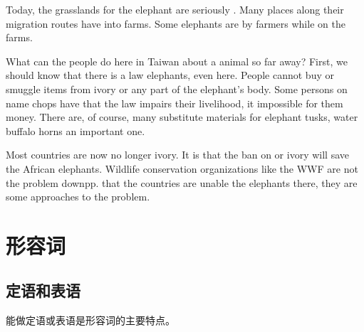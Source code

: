 Today, the  grasslands for the elephant are seriously
. Many places along their migration routes have 
 into farms. Some elephants are  by farmers while
 on the farms.

What can the people do here in Taiwan about a  animal
 so far away? First, we should know that there is a law
 elephants, even here. People cannot buy or smuggle items
 from ivory or any part of the elephant's body. Some
 persons  on  name chops have
  that the law impairs their livelihood, 
it impossible for them  money. There are, of course, many
substitute materials for elephant tusks, water buffalo horns  an
important one.

Most countries are now no longer  ivory. It is 
that the ban on  or  ivory will save the
 African elephants. Wildlife conservation organizations like
the WWF are not  the problem  down{pp}. 
that the  countries are unable  the
elephants there, they are  some 
approaches to  the problem.

\chapter{形容词}

\section{定语和表语}
\label{subsec:attrpred}

能做定语或表语是形容词的主要特点。

